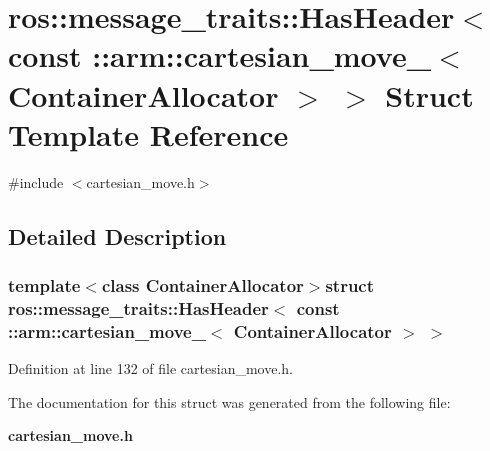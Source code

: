 \section{ros\-:\-:message\-\_\-traits\-:\-:\-Has\-Header$<$ const \-:\-:arm\-:\-:cartesian\-\_\-move\-\_\-$<$ \-Container\-Allocator $>$ $>$ \-Struct \-Template \-Reference}
\label{structros_1_1message__traits_1_1HasHeader_3_01const_01_1_1arm_1_1cartesian__move___3_01ContainerAllocator_01_4_01_4}


{\ttfamily \#include $<$cartesian\-\_\-move.\-h$>$}



\subsection{\-Detailed \-Description}
\subsubsection*{template$<$class Container\-Allocator$>$struct ros\-::message\-\_\-traits\-::\-Has\-Header$<$ const \-::arm\-::cartesian\-\_\-move\-\_\-$<$ Container\-Allocator $>$ $>$}



\-Definition at line 132 of file cartesian\-\_\-move.\-h.



\-The documentation for this struct was generated from the following file\-:\begin{DoxyCompactItemize}
\item 
{\bf cartesian\-\_\-move.\-h}\end{DoxyCompactItemize}

